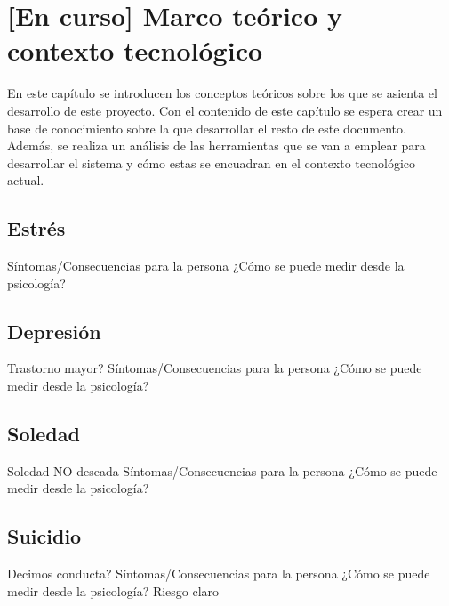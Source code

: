\chapter{[En curso] Marco teórico y contexto tecnológico}
\label{chapter:marco}


En este capítulo se introducen los conceptos teóricos sobre los que se asienta el desarrollo de este proyecto. Con el contenido de este capítulo se espera crear un base de conocimiento sobre la que desarrollar el resto de este documento. Además, se realiza un análisis de las herramientas que se van a emplear para desarrollar el sistema y cómo estas se encuadran en el contexto tecnológico actual.


%
    
\section{Estrés}
    
    Síntomas/Consecuencias para la persona
    ¿Cómo se puede medir desde la psicología?
\section{Depresión}
    Trastorno mayor?
    Síntomas/Consecuencias para la persona
    ¿Cómo se puede medir desde la psicología?
\section{Soledad}
    Soledad NO deseada
    Síntomas/Consecuencias para la persona
    ¿Cómo se puede medir desde la psicología?
\section{Suicidio}
    Decimos conducta?
    Síntomas/Consecuencias para la persona
    ¿Cómo se puede medir desde la psicología? Riesgo claro
        

